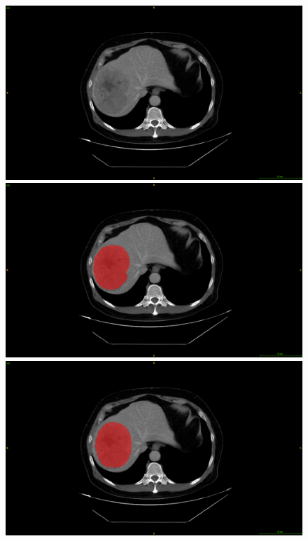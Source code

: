 \begin{figure}
\begin{minipage}{0.3\linewidth}
\includegraphics[width=\linewidth]{../HistologicalGradePrediction/images/image13.png}
\end{minipage}
\hspace{0.1cm}
\begin{minipage}{0.3\linewidth}
\includegraphics[width=\linewidth]{../HistologicalGradePrediction/images/image10.png}
\end{minipage}
\hspace{0.1cm}
\begin{minipage}{0.3\linewidth}
\includegraphics[width=\linewidth]{../HistologicalGradePrediction/images/image7.png}

\end{minipage}
\end{figure}
